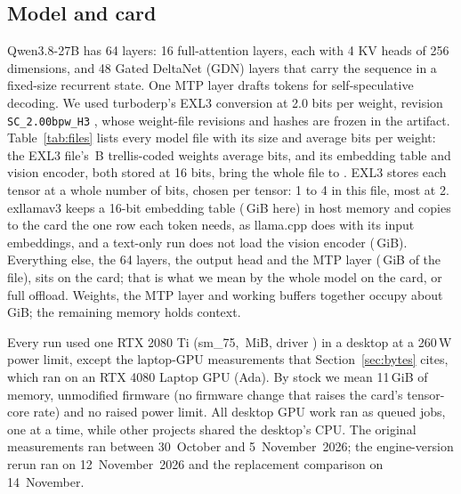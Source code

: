 \documentclass[11pt,letterpaper]{article}
\newcommand{\q}[1]{\texttt{#1}}
\begin{document}
\subsection{Model and card}
\label{sec:model}
Qwen3.8-27B \citep{qwen2026qwen38card} has 64 layers: 16 full-attention
layers, each with 4 KV heads of 256 dimensions, and 48 Gated DeltaNet (GDN)
layers \citep{yang2025gated} that carry the sequence in a fixed-size recurrent
state.
One MTP layer \citep{gloeckle2024multitoken} drafts tokens for
self-speculative decoding. We used turboderp's EXL3 conversion at 2.0 bits per
weight, revision \q{SC\_2.00bpw\_H3} \citep{turboderp2026qwen38exl3sc}, whose
weight-file revisions and hashes are frozen in the artifact. Table~\ref{tab:files} lists every model file with
its size and average bits per weight: the EXL3 file's \PeFilesExlTrellisParams\,B
trellis-coded weights average \PeFilesExlTrellisBpw{} bits, and its embedding
table and vision encoder, both stored at 16 bits, bring the whole file to
\PeFilesExlBpw. EXL3 stores each tensor at a whole number of bits, chosen per
tensor: 1 to 4 in this file, most at 2. exllamav3 keeps a 16-bit embedding
table (\PeEmbedGiB\,GiB here) in host memory and copies to the card the one
row each token needs, as llama.cpp does with its input embeddings, and a
text-only run does not load the vision encoder (\PeVisionGiB\,GiB).
Everything else, the 64 layers, the output head and the MTP layer
(\PeOnCardGiB\,GiB of the file), sits on the card; that is what we mean by
the whole model on the card, or full offload.
Weights, the MTP layer and working buffers together occupy about
\PeRestGiB\,GiB; the remaining memory holds context.

Every run used one RTX 2080 Ti (sm\_75, \PeCardMiB\,MiB, driver \PeDriver) in
a desktop at a 260\,W power limit, except the laptop-GPU measurements that
Section~\ref{sec:bytes} cites, which ran on an RTX 4080 Laptop GPU (Ada). By
stock we mean 11\,GiB of memory, unmodified firmware (no firmware change that
raises the card's tensor-core rate) and no raised power limit. All desktop GPU work ran as queued jobs, one at a
time, while other projects shared the desktop's CPU. The original measurements
ran between 30~October and 5~November~2026; the engine-version rerun ran on
12~November~2026 and the replacement comparison on 14~November.
\end{document}
